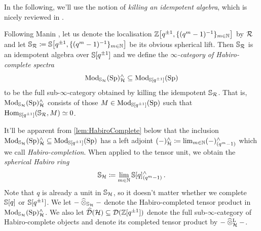 \documentclass[DIV=12,numbers=enddot,leqno,bibliography=totoc]{scrartcl}
\begin{document}
	
	In the following, we'll use the notion of \emph{killing an idempotent algebra}, which is nicely reviewed in \cite[Lecture~\href{https://youtu.be/38PzTzCiMow?list=PLx5f8IelFRgGmu6gmL-Kf_Rl_6Mm7juZO&t=5523}{13}]{AnalyticStacks}.
	
	\begin{numpar}\label{par:HabiroComplete}
		Following Manin \cite[\S{}]{Manin}, let us denote the localisation $\IZ\left[q^{\pm 1},\{(q^m-1)^{-1}\}_{m\in\IN}\right]$ by $\mathcal{R}$ and let $\IS_\Rr\coloneqq \IS\left[q^{\pm 1},\{(q^m-1)^{-1}\}_{m\in\IN}\right]$ be its obvious spherical lift. Then $\mathbb{S}_{\mathcal{R}}$ is an idempotent algebra over $\mathbb{S}[q^{\pm 1}]$ and we define the \emph{$\infty$-category of Habiro-complete spectra}
		\begin{equation*}
			\operatorname{Mod}_{\mathbb{S}_{\mathcal{H}}}(\mathrm{Sp})_{\mathcal{H}}^\wedge\subseteq \operatorname{Mod}_{\mathbb{S}[q^{\pm 1}]}(\mathrm{Sp})
		\end{equation*}
		to be the full sub-$\infty$-category obtained by killing the idempotent $\mathbb{S}_{\mathcal{R}}$. That is, $\operatorname{Mod}_{\mathbb{S}_{\mathcal{H}}}(\mathrm{Sp})_{\mathcal{H}}^\wedge$ consists of those $M\in \operatorname{Mod}_{\mathbb{S}[q^{\pm 1}]}(\mathrm{Sp})$ such that $\operatorname{Hom}_{\mathbb{S}[q^{\pm 1}]}(\mathbb{S}_{\mathcal{R}},M)\simeq 0$.
		
		It'll be apparent from \cref{lem:HabiroComplete} below that the inclusion $\operatorname{Mod}_{\mathbb{S}_{\mathcal{H}}}(\mathrm{Sp})_{\mathcal{H}}^\wedge\subseteq \operatorname{Mod}_{\mathbb{S}[q^{\pm 1}]}(\mathrm{Sp})$ has a left adjoint $(-)_\Hh^\complete\coloneqq\limit_{m\in\IN}(-)_{(q^m-1)}^\complete$ which we call \emph{Habiro-completion}. When applied to the tensor unit, we obtain the \emph{spherical Habiro ring}
		\begin{equation*}
			\IS_\Hh\coloneqq \limit_{m\in\IN}\IS[q]_{(q^m-1)}^\complete\,.
		\end{equation*}
		Note that $q$ is already a unit in $\mathbb{S}_{\mathcal{H}}$, so it doesn't matter whether we complete $\mathbb{S}[q]$ or $\mathbb{S}[q^{\pm 1}]$. We let $-\mathbin{\widehat{\otimes}}_{\mathbb{S}_{\mathcal{H}}}-$ denote the Habiro-completed tensor product in $\operatorname{Mod}_{\mathbb{S}_{\mathcal{H}}}(\mathrm{Sp})_{\mathcal{H}}^\wedge$. We also let $\widehat{\mathcal{D}}(\mathcal{H})\subseteq \mathcal{D}(\mathbb{Z}[q^{\pm 1}])$ denote the full sub-$\infty$-category of Habiro-complete objects and denote its completed tensor product by $-\clotimes_\Hh-$.
	\end{numpar}
\end{document}
